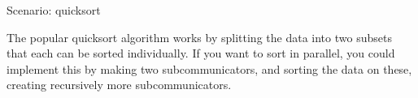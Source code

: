  {Scenario: quicksort}

The popular quicksort algorithm works by splitting the data
into two subsets that each can be sorted individually.
If you want to sort in parallel, you could implement this by making two subcommunicators,
and sorting the data on these, creating recursively more subcommunicators.










